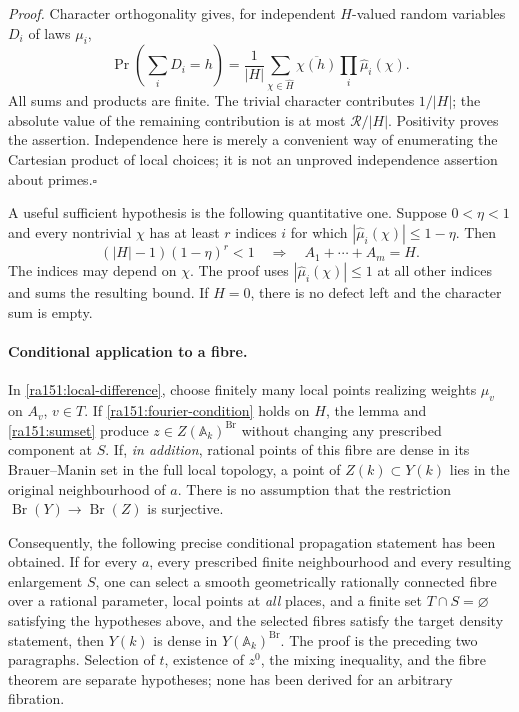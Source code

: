 \documentclass[11pt]{article}
\newcommand{\A}{\mathbb{A}}
\begin{document}
\emph{Proof.}
Character orthogonality gives, for independent $H$-valued random variables
$D_i$ of laws $\mu_i$,
\[
 \Pr\left(\sum_iD_i=h\right)
 =\frac1{|H|}\sum_{\chi\in\widehat H}
       \overline{\chi(h)}\prod_i\widehat\mu_i(\chi).
\]
All sums and products are finite.  The trivial character contributes $1/|H|$;
the absolute value of the remaining contribution is at most
$\mathcal R/|H|$.  Positivity proves the assertion.  Independence here is
merely a convenient way of enumerating the Cartesian product of local choices;
it is not an unproved independence assertion about primes.\hfill$\square$

A useful sufficient hypothesis is the following quantitative one.  Suppose
$0<\eta<1$ and every nontrivial $\chi$ has at least $r$ indices $i$ for which
$|\widehat\mu_i(\chi)|\le1-\eta$.  Then
\begin{equation}\label{ra151:quantitative}
 (|H|-1)(1-\eta)^r<1
 \quad\Longrightarrow\quad A_1+\cdots+A_m=H.
\end{equation}
The indices may depend on $\chi$.  The proof uses
$|\widehat\mu_i(\chi)|\le1$ at all other indices and sums the resulting bound.
If $H=0$, there is no defect left and the character sum is empty.

\paragraph{Conditional application to a fibre.}
In \eqref{ra151:local-difference}, choose finitely many local points realizing
weights $\mu_v$ on $A_v$, $v\in T$.  If
\eqref{ra151:fourier-condition} holds on $H$, the lemma and
\eqref{ra151:sumset} produce $z\in Z(\A_k)^{\operatorname{Br}}$ without changing
any prescribed component at $S$.  If, \emph{in addition}, rational points of
this fibre are dense in its Brauer--Manin set in the full local topology, a
point of $Z(k)\subset Y(k)$ lies in the original neighbourhood of $a$.
There is no assumption that the restriction $\operatorname{Br}(Y)\to
\operatorname{Br}(Z)$ is surjective.

Consequently, the following precise conditional propagation statement has
been obtained.  If for every $a$, every prescribed finite neighbourhood and
every resulting enlargement $S$, one can select a smooth geometrically
rationally connected fibre over a rational parameter, local points at \emph{all} places, and a finite set $T\cap S=\varnothing$
satisfying the hypotheses above, and the selected fibres satisfy the target
density statement, then $Y(k)$ is dense in $Y(\A_k)^{\operatorname{Br}}$.
The proof is the preceding two paragraphs.  Selection of $t$, existence of
$z^0$, the mixing inequality, and the fibre theorem are separate hypotheses;
none has been derived for an arbitrary fibration.
\end{document}

